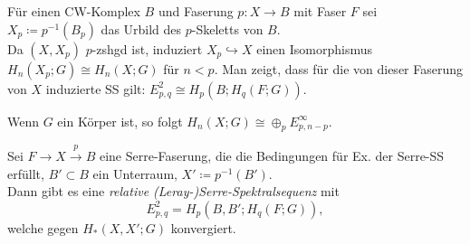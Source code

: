 \documentclass{cheat-sheet}
\newenvironment{centertikzcd}
  {\begin{center}\begin{tikzcd}}
  {\end{tikzcd}\end{center}}
\begin{document}
\begin{konstr}
  Für einen CW-Komplex $B$ und Faserung $p : X \to B$ mit Faser $F$ sei $X_p \coloneqq p^{-1}(B_p)$ das Urbild des $p$-Skeletts von $B$. \\
  Da $(X, X_p)$ $p$-zshgd ist, induziert $X_p \hookrightarrow X$ einen Isomorphismus $H_n(X_p; G) \cong H_n(X; G)$ für $n < p$.
  Man zeigt, dass für die von dieser Faserung von $X$ induzierte SS gilt: $E^2_{p,q} \cong H_p(B; H_q(F; G))$.
\end{konstr}

\begin{bem}
  Wenn $G$ ein Körper ist, so folgt $H_n(X; G) \cong \oplus_p E^\infty_{p,n-p}$.
\end{bem}


\begin{thm}
  Sei $F \to X \xrightarrow{p} B$ eine Serre-Faserung, die die Bedingungen für Ex. der Serre-SS erfüllt, $B' \!\subset\! B$ ein Unterraum, $X' \!\coloneqq\! p^{-1}(B')$. \\
  Dann gibt es eine \emph{relative (Leray-)Serre-Spektralsequenz} mit
  \[ E^2_{p,q} = H_p(B, B'; H_q(F; G)), \]
  welche gegen $H_*(X, X'; G)$ konvergiert.
\end{thm}

\end{document}
